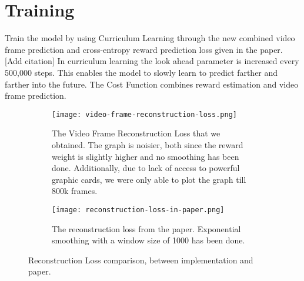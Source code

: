 \documentclass[12pt, a4paper, oneside]{report}
\begin{document}
        \section{Training} 
            \par Train the model by using Curriculum Learning through the new combined video frame prediction and cross-entropy reward prediction loss given in the paper. [Add citation] In curriculum learning the look ahead parameter is increased every 500,000 steps. This enables the model to slowly learn to predict farther and farther into the future. The Cost Function combines reward estimation and video frame prediction.
            \begin{figure}[h!]
                \centering
                \begin{subfigure}[b]{\textwidth}
                    \centering
                    \texttt{[image: video-frame-reconstruction-loss.png]}
                    \caption{The Video Frame Reconstruction Loss that we obtained. The graph is noisier, both since the reward weight is slightly higher and no smoothing has been done. Additionally, due to lack of access to powerful graphic cards, we were only able to plot the graph till 800k frames.}
                \end{subfigure}
                \hfill
                \begin{subfigure}[b]{\textwidth}
                    \centering
                    \texttt{[image: reconstruction-loss-in-paper.png]}
                    \caption{The reconstruction loss from the paper. Exponential smoothing with a window size of 1000 has been done.}
                \end{subfigure}
                \caption[Reconstruction Loss comparison]{Reconstruction Loss comparison, between implementation and paper.}
            \end{figure}
\end{document}
